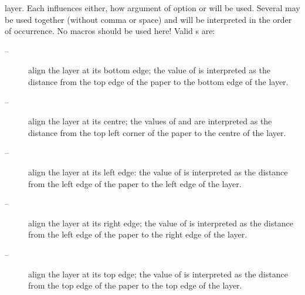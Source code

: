 \begin{desclist}
{    layer. Each  influences either, how argument
     of option  or  will be
    used. Several  may be used together (without
    comma or space) and will be interpreted in the order of occurrence. No
    macros should be used here! Valid s are:
    \begin{description}
    \item[ --] align the layer at its bottom edge; the
      value of
       is interpreted as the distance from the top edge of the
      paper to the bottom edge of the layer.
    \item[ --] align the layer at its centre; the values of
       and  are interpreted as the distance
      from the top left corner of the paper to the centre of the layer.
    \item[ --] align the layer at its left edge: the value of
       is interpreted as the distance from the left edge of
      the paper to the left edge of the layer.
    \item[ --] align the layer at its right edge; the value of
       is interpreted as the distance from the left edge of
      the paper to the right edge of the layer.
    \item[ --] align the layer at its top edge; the value of
       is interpreted as the distance from the top edge of the
      paper to the top edge of the layer.
    \end{description}%
  }%
\end{desclist}
